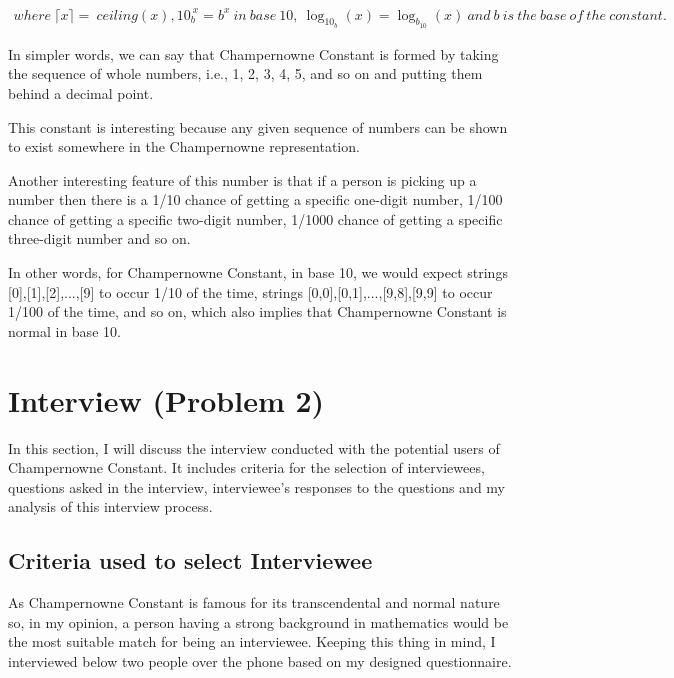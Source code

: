 \documentclass[paper=a4, fontsize=11pt]{report}
\numberwithin{equation}{section}		%
\numberwithin{figure}{section}			%
\numberwithin{table}{section}				%
\begin{document}
\begin{align*}
where\ {\displaystyle \lceil {x}\rceil =} \ ceiling(x), {\displaystyle 10_{b}^{~x}=b^{x}}\ in\ base\ 10,\ {\displaystyle \log _{10_{b}}(x)=\log _{b_{10}}(x)} \ and\  b\ is\ the\ base\ of \ the \ constant.
\end{align*}

\begin{flushleft}
In simpler words, we can say that Champernowne Constant is formed by taking the sequence of whole numbers, i.e., 1, 2, 3, 4, 5, and so on and putting them behind a decimal point.\newline

This constant is interesting because any given sequence of numbers can be shown to exist somewhere in the Champernowne representation.\newline

Another interesting feature of this number is that if a person is picking up a number then there is a 1/10 chance of getting a specific one-digit number, 1/100 chance of getting a specific two-digit number, 1/1000 chance of getting a specific three-digit number and so on.\newline

In other words, for Champernowne Constant, in base 10, we would expect strings [0],[1],[2],...,[9] to occur 1/10 of the time, strings [0,0],[0,1],...,[9,8],[9,9] to occur 1/100 of the time, and so on, which also implies that Champernowne Constant is normal in base 10.
\end{flushleft}


\chapter{Interview (Problem 2)}
In this section, I will discuss the interview conducted with the potential users of Champernowne Constant. \newline
It includes criteria for the selection of interviewees, questions asked in the interview, interviewee's responses to the questions and my analysis of this interview process.

\section{Criteria used to select Interviewee}
As Champernowne Constant is famous for its transcendental and normal nature so, in my opinion, a person having a strong background in mathematics would be the most suitable match for being an interviewee.
Keeping this thing in mind, I interviewed below two people over the phone based on my designed questionnaire.
\end{document}
